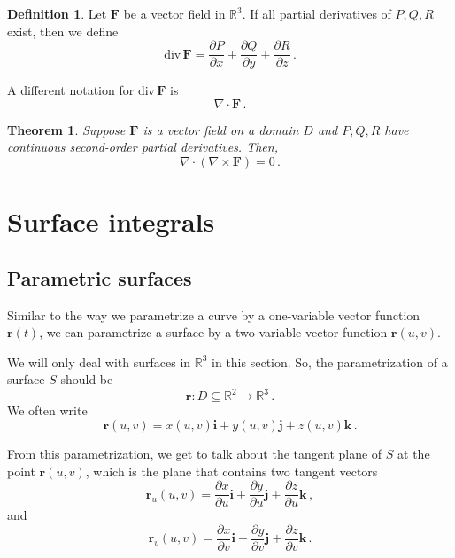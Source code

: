 \documentclass[
]{book}
\newtheorem{theorem}{Theorem}[chapter]
\theoremstyle{definition}
\newtheorem{definition}{Definition}[chapter]
\theoremstyle{definition}
\theoremstyle{definition}
\theoremstyle{definition}
\theoremstyle{remark}
\begin{document}
\begin{definition}
Let \(\mathbf{F}\) be a vector field in \(\mathbb{R}^3\).
If all partial derivatives of \(P,Q,R\) exist, then we define
\begin{equation*}
    \mathrm{div}\,\mathbf{F} =  
    \frac{\partial P}{\partial x} + \frac{\partial Q}{\partial y} + \frac{\partial R}{\partial z} \,.
\end{equation*}
\end{definition}

A different notation for \(\mathrm{div} \, \mathbf{F}\) is
\begin{equation*}
    \nabla \cdot \mathbf{F} \,.
\end{equation*}

\begin{theorem}
Suppose \(\mathbf{F}\) is a vector field on a domain \(D\) and \(P,Q,R\) have continuous
second-order partial derivatives.
Then,
\begin{equation*}
    \nabla \cdot (\nabla \times \mathbf{F}) = 0 \,.
\end{equation*}
\end{theorem}

\hypertarget{surface-integrals}{%
\section{Surface integrals}\label{surface-integrals}}

\hypertarget{parametric-surfaces}{%
\subsection{Parametric surfaces}\label{parametric-surfaces}}

Similar to the way we parametrize a curve by a one-variable vector function
\(\mathbf{r}(t)\), we can parametrize a surface by a two-variable vector function
\(\mathbf{r}(u,v)\).

We will only deal with surfaces in \(\mathbb{R}^3\) in this section. So, the parametrization
of a surface \(S\)
should be
\begin{equation*}
\mathbf{r}: D\subseteq \mathbb{R}^2 \to \mathbb{R}^3 \,.
\end{equation*}
We often write
\begin{equation*}
    \mathbf{r}(u,v) = x(u,v) \mathbf{i} + y(u,v) \mathbf{j} + z(u,v) \mathbf{k} \,.
\end{equation*}

From this parametrization,
we get to talk about the tangent plane of \(S\) at the point \(\mathbf{r}(u,v)\),
which is the plane that contains two tangent vectors
\begin{equation*}
    \mathbf{r}_u (u,v) = \frac{\partial x}{\partial u} \mathbf{i} +  \frac{\partial y}{\partial u} \mathbf{j} 
                            + \frac{\partial z}{\partial u} \mathbf{k} \,,
\end{equation*}
and
\begin{equation*}
    \mathbf{r}_v (u,v) = \frac{\partial x}{\partial v} \mathbf{i} +  \frac{\partial y}{\partial v} \mathbf{j} 
                            + \frac{\partial z}{\partial v} \mathbf{k} \,.
\end{equation*}
\end{document}
